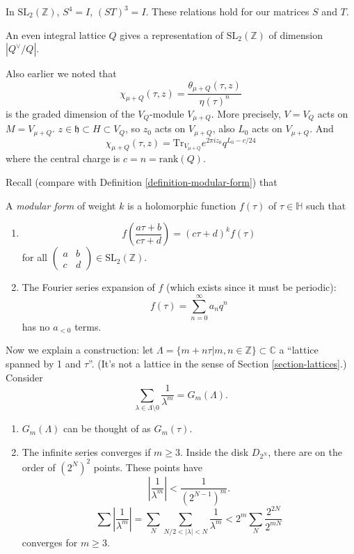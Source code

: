In $\text{SL}_2(\mathbb{Z})$, $S^4=I$,
$(ST)^3=I$.
These relations hold for our matrices $S$ and
$T$.

\begin{proposition}
\label{proposition-latti-sl2-repre}
An even integral lattice $Q$
gives a representation of
$\text{SL}_2(\mathbb{Z})$
of dimension $|Q^\vee/Q|$.
\end{proposition}

\noindent
Also earlier we noted that
$$
\chi_{\mu+Q}(\tau,z)
=\frac{\theta_{\mu+Q}(\tau,z)}{\eta(\tau)^n}
$$
is the graded dimension of the $V_Q$-module
$V_{\mu+Q}$.
More precisely,
$V=V_Q$ acts on $M=V_{\mu+Q}$.
$z \in \mathfrak{h}\subset H\subset V_Q$,
so $z_0$ acts on $V_{\mu+Q}$,
also $L_0$ acts on $V_{\mu+Q}.$
And
$$
\chi_{\mu+Q}(\tau,z)=\text{Tr}_{V_{\mu+Q}}
e^{2\pi
i z_0}
q^{L_0-c/24}
$$
where the central charge is
$c=n=\text{rank}(Q)$.

\medskip\noindent
Recall (compare with Definition
\ref{definition-modular-form}) that

\begin{definition}
\label{definition-modular-form2}
A {\it modular form} of weight $k$ is a
holomorphic function
$f(\tau)$ of $\tau \in \mathbb{H}$ such that
\begin{enumerate}
\item
$$
f\left(\frac{a\tau+b}{c\tau+d}\right)
=(c\tau+d)^kf(\tau)
$$
for all
$\begin{pmatrix}
a&b\\
c&d
\end{pmatrix}\in \text{SL}_2(\mathbb{Z})$.

\item The Fourier series expansion of $f$
(which exists since it must be periodic):
 $$
f(\tau)=\sum_{n=0}^\infty a_nq^n
$$
has no $a_{<0}$ terms.
\end{enumerate}
\end{definition}

\medskip\noindent
Now we explain a construction:
let $\Lambda=\{m+n\tau|m,n \in
\mathbb{Z}\}\subset\mathbb{C}$
a ``lattice spanned by 1 and $\tau$''.
(It's not a lattice in the sense of Section
\ref{section-lattices}.)
Consider
$$
\sum_{\lambda \in \Lambda\setminus 0}
\frac{1}{\lambda^m}=G_m(\Lambda).
$$
\begin{enumerate}
\item $G_m(\Lambda)$ can be thought of as
$G_m(\tau)$.
\item The infinite series converges if $m
\geq 3$.
Inside the disk $D_{2^N}$, there are
on the order of $(2^N)^2$ points.
These points have
$$
\left|\frac{1}{\lambda^m}\right|<\frac{1}
{(2^{N-1})^m}.
$$
$$
\sum\left|\frac{1}{\lambda^m}\right|
=\sum_N\sum_{N/2<|\lambda|<N}
\frac{1}{\lambda^m}
<2^m \sum_N\frac{2^{2N}}{2^{m N}}
$$
converges for $m \geq 3$.
\end{enumerate}

